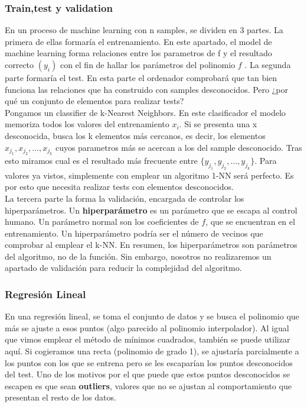 \documentclass[11pt]{article}
\theoremstyle{plain}
\begin{document}
            \subsubsection{Train,test y validation} %
            \label{subsub:train_test_y_validation}
            
                En un proceso de machine learning con n samples, se dividen en 3 partes. La primera de ellas formaría el entrenamiento. En este apartado, el model  de machine learning forma relaciones entre los parametros de f y el resultado correcto $(y_i)$ con el fin de hallar los parámetros del polinomio $f  $ . La segunda parte formaría el test. En esta parte el ordenador comprobará que tan bien funciona las relaciones que ha construido con samples    desconocidos. Pero ¿por qué un conjunto de elementos para realizar tests?\\    
    
                Pongamos un classifier de k-Nearest Neighbors. En este clasificador el modelo memoriza todos los valores del entrenamiento $x_i$. Si se presenta una    x desconocida, busca los k  elementos más cercanos, es decir, los elementos $x_{j_{1}},x_{j_{2}},...,x_{j_{k}}$ cuyos parametros más se acercan a  los del sample desconocido. Tras esto miramos cual es el resultado más frecuente entre $\{y_{j_{1}},y_{j_{2}},...,y_{j_{k}}\}$. Para valores ya  vistos, simplemente con emplear un algoritmo 1-NN será perfecto. Es por esto que necesita realizar tests con elementos desconocidos.\\   
    
                La tercera parte la forma la validación, encargada de controlar los hiperparámetros. Un \textbf{hiperparámetro} es un parámetro que se escapa al    control humano. Un parámetro normal son los coeficientes de $f$, que se encuentran en el entrenamiento. Un hiperparámetro podría ser el número de    vecinos que comprobar al emplear el k-NN. En resumen, los hiperparámetros son parámetros del algoritmo, no de la función. Sin embargo, nosotros no   realizaremos un apartado de validación para reducir la complejidad del algoritmo.

            \subsubsection{Regresión Lineal} %
            \label{subsub:regresión_lineal}
                 En una regresión lineal, se toma el conjunto de datos y se busca el polinomio que más se ajuste a esos puntos (algo parecido al polinomio interpolador). Al igual que vimos emplear el método de mínimos cuadrados, también se puede utilizar aquí. Si cogieramos una recta (polinomio de grado 1), se ajustaría parcialmente a los puntos con los que se entrena pero se les escaparían los puntos desconocidos del test. Uno de los motivos por el que puede que estos puntos desconocidos se escapen es que sean \textbf{outliers}, valores que no se ajustan al comportamiento que presentan el resto de los datos.\\
\end{document}
